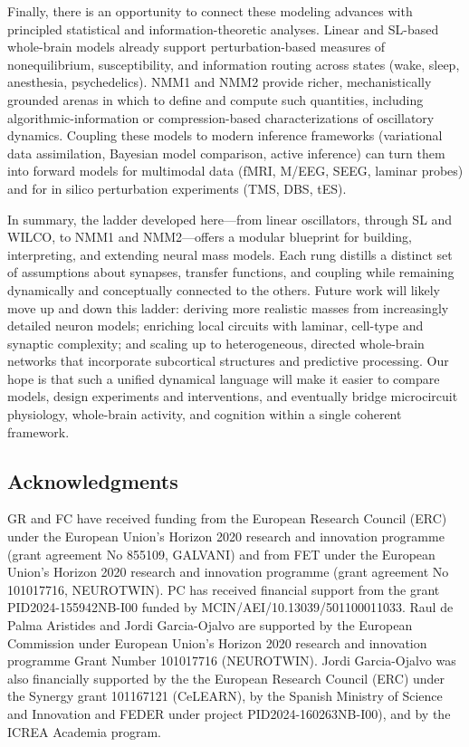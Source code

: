 \documentclass[12pt]{article}
\numberwithin{equation}{section}
\begin{document}
Finally, there is an opportunity to connect these modeling advances with principled statistical and information-theoretic analyses. Linear and SL-based whole-brain models already support perturbation-based measures of nonequilibrium, susceptibility, and information routing across states (wake, sleep, anesthesia, psychedelics).\cite{decoTurbulentlikeDynamicsHuman2020,Escrichs2022Turbulence,cruzatEffectsClassicPsychedelic2022} NMM1 and NMM2 provide richer, mechanistically grounded arenas in which to define and compute such quantities, including algorithmic-information or compression-based characterizations of oscillatory dynamics. Coupling these models to modern inference frameworks (variational data assimilation, Bayesian model comparison, active inference) can turn them into forward models for multimodal data (fMRI, M/EEG, SEEG, laminar probes) and for in silico perturbation experiments (TMS, DBS, tES).\cite{breakspearDynamicModelsLargescale2017,Sadeghi2020,duchetHowDesignOptimal2024} 

In summary, the ladder developed here—from linear oscillators, through SL and WILCO, to NMM1 and NMM2—offers a modular blueprint for building, interpreting, and extending neural mass models. Each rung distills a distinct set of assumptions about synapses, transfer functions, and coupling while remaining dynamically and conceptually connected to the others. Future work will likely move up and down this ladder: deriving more realistic masses from increasingly detailed neuron models; enriching local circuits with laminar, cell-type and synaptic complexity; and scaling up to heterogeneous, directed whole-brain networks that incorporate subcortical structures and predictive processing. Our hope is that such a unified dynamical language will make it easier to compare models, design experiments and interventions, and eventually bridge microcircuit physiology, whole-brain activity, and cognition within a single coherent framework.


 \subsection*{Acknowledgments}
GR and FC have received funding from the European Research Council (ERC) under the European Union’s Horizon 2020 research and innovation programme (grant agreement No 855109, GALVANI) and from FET under the European Union’s Horizon 2020 research and innovation programme (grant agreement No 101017716, NEUROTWIN). 
PC has received financial support from the grant PID2024-155942NB-I00 funded by MCIN/AEI/10.13039/501100011033.
Raul de Palma Aristides and Jordi Garcia-Ojalvo are supported by the European Commission under European Union’s Horizon 2020 research and innovation programme Grant Number 101017716 (NEUROTWIN). Jordi Garcia-Ojalvo was also financially supported by the the European Research Council (ERC) under the Synergy grant 101167121 (CeLEARN), by the Spanish Ministry of Science and Innovation and FEDER under project PID2024-160263NB-I00), and by the ICREA Academia program.
\end{document}
